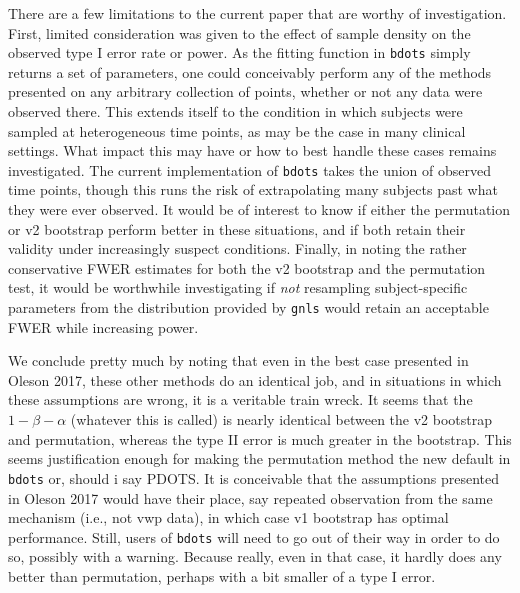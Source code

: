 \documentclass{article}
\newcommand{\xt}{\texttt}
\begin{document}
There are a few limitations to the current paper that are worthy of investigation. First, limited consideration was given to the effect of sample density on the observed type I error rate or power. As the fitting function in \xt{bdots} simply returns a set of parameters, one could conceivably perform any of the methods presented on any arbitrary collection of points, whether or not any data were observed there. This extends itself to the condition in which subjects were sampled at heterogeneous time points, as may be the case in many clinical settings. What impact this may have or how to best handle these cases remains investigated. The current implementation of \xt{bdots} takes the union of observed time points, though this runs the risk of extrapolating many subjects past what they were ever observed. It would be of interest to know if either the permutation or v2 bootstrap perform better in these situations, and if both retain their validity under increasingly suspect conditions. Finally, in noting the rather conservative FWER estimates for both the v2 bootstrap and the permutation test, it would be worthwhile investigating if \textit{not} resampling subject-specific parameters from the distribution provided by \xt{gnls} would retain an acceptable FWER while increasing power.

We conclude pretty much by noting that even in the best case presented in Oleson 2017, these other methods do an identical job, and in situations in which these assumptions are wrong, it is a veritable train wreck. It seems that the $1 - \beta - \alpha$ (whatever this is called) is nearly identical between the v2 bootstrap and permutation, whereas the type II error is much greater in the bootstrap. This seems justification enough for making the permutation method the new default in \xt{bdots} or, should i say PDOTS. It is conceivable that the assumptions presented in Oleson 2017 would have their place, say repeated observation from the same mechanism (i.e., not vwp data), in which case v1 bootstrap has optimal performance. Still, users of \xt{bdots} will need to go out of their way in order to do so, possibly with a warning. Because really, even in that case, it hardly does any better than permutation, perhaps with a bit smaller of a type I error.


\end{document}
